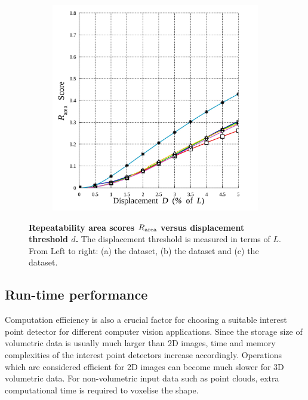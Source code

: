 \begin{figure}[ht]
\begin{subfigure}[t]{0.49\linewidth}
		\label{fig/eval/graph_mri}
	\end{subfigure}
	\begin{subfigure}[t]{0.49\linewidth}
		\centering 
		\includegraphics[width=0.95\linewidth]{./fig/eval/graph_stereo.jpg}
		\label{fig/eval/graph_mvs}
	\end{subfigure}
	\caption{\textbf{Repeatability area scores $R_\textrm{area}$ versus displacement threshold $d$.} The displacement threshold is measured in terms of $L$. From Left to right: (a) the \meshset dataset, (b) the \mriset dataset and (c) the \stereoset dataset.}
\label{fig/eval/graph2}
\end{figure}

\subsection{Run-time performance}

Computation efficiency is also a crucial factor for choosing a suitable interest point detector for different computer vision applications. Since the storage size of volumetric data is usually much larger than 2D images, time and memory complexities of the interest point detectors increase accordingly. Operations which are considered efficient for 2D images can become much slower for 3D volumetric data. For non-volumetric input data such as point clouds, extra computational time is required to voxelise the shape. 

